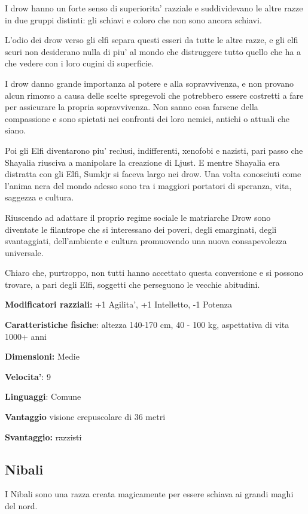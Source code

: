 \documentclass[a4paper,11pt,twoside,openany]{book}
\begin{document}
I drow hanno un forte senso di superiorita' razziale e suddividevano le altre razze in due gruppi distinti: gli schiavi e coloro che non sono ancora schiavi.

L'odio dei drow verso gli elfi separa questi esseri da tutte le altre razze, e gli elfi scuri non desiderano nulla di piu' al mondo che distruggere tutto quello che ha a che vedere con i loro cugini di superficie.

I drow danno grande importanza al potere e alla sopravvivenza, e non provano alcun rimorso a causa delle scelte spregevoli che potrebbero essere costretti a fare per assicurare la propria sopravvivenza. Non sanno cosa farsene della compassione e sono spietati nei confronti dei loro nemici, antichi o attuali che siano.

Poi gli Elfi diventarono piu' reclusi, indifferenti, xenofobi e nazisti, pari passo che Shayalia riusciva a manipolare la creazione di Ljust. E mentre Shayalia era distratta con gli Elfi, Sumkjr si faceva largo nei drow. Una volta conosciuti come l'anima nera del mondo adesso sono tra i maggiori portatori di speranza, vita, saggezza e cultura.

Riuscendo ad adattare il proprio regime sociale le matriarche Drow sono diventate le filantrope che si interessano dei poveri, degli emarginati, degli svantaggiati, dell'ambiente e cultura promuovendo una nuova consapevolezza universale.

Chiaro che, purtroppo, non tutti hanno accettato questa conversione e si possono trovare, a pari degli Elfi, soggetti che perseguono le vecchie abitudini.

\textbf{Modificatori razziali:} +1 Agilita', +1 Intelletto, -1 Potenza

\textbf{Caratteristiche fisiche}: altezza 140-170 cm, 40 - 100 kg,
aspettativa di vita 1000+ anni

\textbf{Dimensioni:} Medie

\textbf{Velocita'}: 9

\textbf{Linguaggi}: Comune

\textbf{Vantaggio} visione crepuscolare di 36 metri

\textbf{Svantaggio:} \sout{razzisti}

\subsection{Nibali}

\label{nibali}

I Nibali sono una razza creata magicamente per essere schiava ai grandi maghi del nord.
\end{document}
